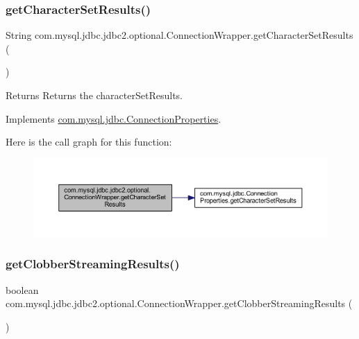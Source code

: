 \subsubsection{\texorpdfstring{get\+Character\+Set\+Results()}{getCharacterSetResults()}}
{\footnotesize\ttfamily String com.\+mysql.\+jdbc.\+jdbc2.\+optional.\+Connection\+Wrapper.\+get\+Character\+Set\+Results (\begin{DoxyParamCaption}{ }\end{DoxyParamCaption})}

\begin{DoxyReturn}{Returns}
Returns the character\+Set\+Results. 
\end{DoxyReturn}


Implements \mbox{\hyperlink{interfacecom_1_1mysql_1_1jdbc_1_1_connection_properties_a64a9d2f56ed041326aa829a7f665747a}{com.\+mysql.\+jdbc.\+Connection\+Properties}}.

Here is the call graph for this function\+:
\nopagebreak
\begin{figure}[H]
\begin{center}
\leavevmode
\includegraphics[width=350pt]{classcom_1_1mysql_1_1jdbc_1_1jdbc2_1_1optional_1_1_connection_wrapper_a2ee7452dd873073dc9012388bfd92212_cgraph}
\end{center}
\end{figure}
\mbox{\label{classcom_1_1mysql_1_1jdbc_1_1jdbc2_1_1optional_1_1_connection_wrapper_a66698db6904b10d47dabdfcee7ba799e}} 
\subsubsection{\texorpdfstring{get\+Clobber\+Streaming\+Results()}{getClobberStreamingResults()}}
{\footnotesize\ttfamily boolean com.\+mysql.\+jdbc.\+jdbc2.\+optional.\+Connection\+Wrapper.\+get\+Clobber\+Streaming\+Results (\begin{DoxyParamCaption}{ }\end{DoxyParamCaption})}

